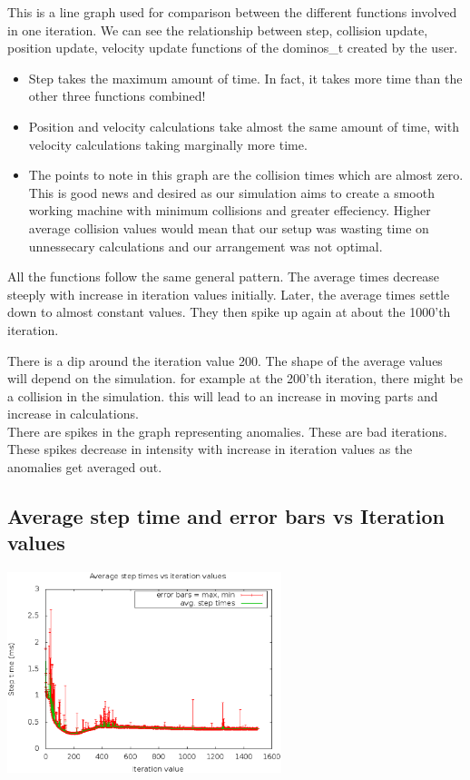 \documentclass[a4paper,11pt]{article}
\begin{document}
This is a line graph used for comparison between the different functions involved in one iteration. We can see the relationship between step, collision update, position update, velocity update functions of the dominos\_t created by the user. 

\begin{itemize}
  \item Step takes the maximum amount of time. In fact, it takes more time than the other three functions combined!
  \item Position and velocity calculations take almost the same amount of time, with velocity calculations taking marginally more time. 
  \item The points to note in this graph are the collision times which are almost zero. This is good news and desired as our simulation aims to create a smooth working machine with minimum collisions and greater effeciency. Higher average collision values would mean that our setup was wasting time on unnessecary calculations and our arrangement was not optimal.   

\end{itemize}

All the functions follow the same general pattern. The average times decrease steeply with increase in iteration values initially. Later, the average times settle down to almost constant values. They then spike up again at about the 1000'th iteration.

There is a dip around the iteration value 200. The shape of the average values will depend on the simulation. for example at the 200'th iteration, there might be a collision in the simulation. this will lead to an increase in moving parts and increase in calculations.\\

There are spikes in the graph representing anomalies. These are bad iterations. These spikes decrease in intensity with increase in iteration values as the anomalies get averaged out. 


\subsection{Average step time and error bars vs Iteration values}

\begin{center}
\includegraphics[width=0.6\textwidth]{plots/g05_plot03.eps} 
\end{center}
\end{document}
